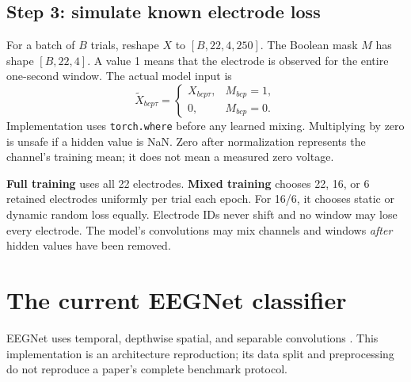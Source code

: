 \documentclass[11pt,a4paper]{article}
\newcommand{\code}[1]{{\small\nolinkurl{#1}}}
\begin{document}
\subsection*{Step 3: simulate known electrode loss}
For a batch of $B$ trials, reshape $X$ to $[B,22,4,250]$. The Boolean mask
$M$ has shape $[B,22,4]$. A value 1 means that the electrode is observed for
the entire one-second window. The actual model input is
\[
\widetilde X_{bcp\tau}=
\begin{cases}X_{bcp\tau},&M_{bcp}=1,\\0,&M_{bcp}=0.\end{cases}
\]
Implementation uses \code{torch.where} before any learned mixing. Multiplying
by zero is unsafe if a hidden value is NaN. Zero after normalization represents
the channel's training mean; it does not mean a measured zero voltage.

\begin{center}
\end{center}
\textbf{Full training} uses all 22 electrodes. \textbf{Mixed training} chooses
22, 16, or 6 retained electrodes uniformly per trial each epoch. For 16/6, it
chooses static or dynamic random loss equally. Electrode IDs never shift and no
window may lose every electrode. The model's convolutions may mix channels and
windows \emph{after} hidden values have been removed.

\newpage
\section{The current EEGNet classifier}
EEGNet uses temporal, depthwise spatial, and separable convolutions
\cite{eegnet}. This implementation is an architecture reproduction; its data
split and preprocessing do not reproduce a paper's complete benchmark protocol.
\end{document}
